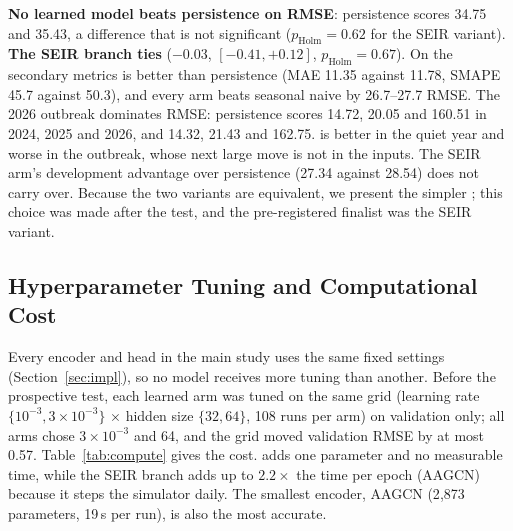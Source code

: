 \textbf{No learned model beats persistence on RMSE}: persistence scores 34.75 and
\model{} 35.43, a difference that is not significant ($p_{\text{Holm}}=0.62$ for the
SEIR variant). \textbf{The SEIR branch ties \model{}} ($-0.03$, $[-0.41,+0.12]$,
$p_{\text{Holm}}=0.67$). On the secondary metrics \model{} is better than persistence
(MAE 11.35 against 11.78, SMAPE 45.7 against 50.3), and every arm beats seasonal naive
by 26.7--27.7 RMSE. The 2026 outbreak dominates RMSE: persistence scores 14.72, 20.05 and
160.51 in 2024, 2025 and 2026, and \model{} 14.32, 21.43 and 162.75. \model{} is better
in the quiet year and worse in the outbreak, whose next large move is not in the inputs.
The SEIR arm's development advantage over persistence (27.34 against 28.54) does not
carry over. Because the two variants are equivalent, we present the simpler \model{};
this choice was made after the test, and the pre-registered finalist was the SEIR
variant.

\subsection{Hyperparameter Tuning and Computational Cost}
\label{sec:cost}
Every encoder and head in the main study uses the same fixed settings
(Section~\ref{sec:impl}), so no model receives more tuning than another. Before the
prospective test, each learned arm was tuned on the same grid (learning rate
$\{10^{-3},3\times10^{-3}\}$ $\times$ hidden size $\{32,64\}$, 108 runs per arm) on
validation only; all arms chose $3\times10^{-3}$ and 64, and the grid moved validation
RMSE by at most 0.57. Table~\ref{tab:compute} gives the cost. \model{} adds one parameter
and no measurable time, while the SEIR branch adds up to $2.2\times$ the time per epoch
(AAGCN) because it steps the simulator daily. The smallest encoder, AAGCN
(2{,}873 parameters, 19\,s per run), is also the most accurate.

